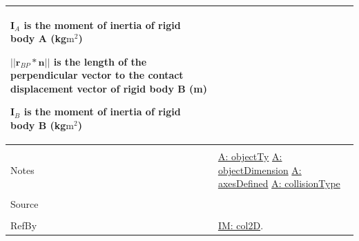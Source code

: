 \documentclass[12pt]{article}
\begin{document}
\begin{minipage}{\textwidth}
\begin{tabular}{p{} p{}}
\begin{symbDescription}
                                                  \item{${\mathbf{I}_{A}}$ is the moment of inertia of rigid body A (kg$\text{m}^{2}$)}
                                                  \item{$||{\mathbf{r}_{BP}}*\mathbf{n}||$ is the length of the perpendicular vector to the contact displacement vector of rigid body B (m)}
                                                  \item{${\mathbf{I}_{B}}$ is the moment of inertia of rigid body B (kg$\text{m}^{2}$)}
                                                  \end{symbDescription}
                                                  \\ \midrule \\
                                                  Notes & \hyperref[assumpOT]{A: objectTy}
                                                          \hyperref[assumpOD]{A: objectDimension}
                                                          \hyperref[assumpAD]{A: axesDefined}
                                                          \hyperref[assumpCT]{A: collisionType}
                                                          \\ \midrule \\
                                                          Source & \\ \midrule \\
                                                                   RefBy & \hyperref[IM:col2D]{IM: col2D}.
\\ \bottomrule \end{tabular}
\end{minipage}
\par~
\end{document}

